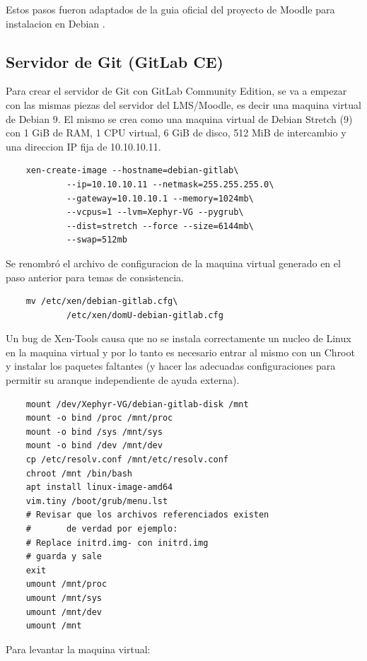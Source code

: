 Estos pasos fueron adaptados de la guia oficial del proyecto de Moodle para instalacion en Debian \citep{MOODLE-Install-Debian}.


\subsection{Servidor de Git (GitLab CE)}
Para crear el servidor de Git con GitLab Community Edition, se va a empezar con las mismas piezas del servidor del LMS/Moodle, es decir una maquina virtual de Debian 9. El mismo se crea como una maquina virtual de Debian Stretch (9) con 1 GiB de RAM, 1 CPU virtual, 6 GiB de disco, 512 MiB de intercambio y una direccion IP fija de 10.10.10.11.
\begin{lstlisting}
	xen-create-image --hostname=debian-gitlab\
    		--ip=10.10.10.11 --netmask=255.255.255.0\
        	--gateway=10.10.10.1 --memory=1024mb\
        	--vcpus=1 --lvm=Xephyr-VG --pygrub\
        	--dist=stretch --force --size=6144mb\
        	--swap=512mb
\end{lstlisting}

Se renombró el archivo de configuracion de la maquina virtual generado en el paso anterior para temas de consistencia.

\begin{lstlisting}
	mv /etc/xen/debian-gitlab.cfg\
    		/etc/xen/domU-debian-gitlab.cfg
\end{lstlisting}

Un bug de Xen-Tools causa que no se instala correctamente un nucleo de Linux en la maquina virtual y por lo tanto es necesario entrar al mismo con un Chroot y instalar los paquetes faltantes (y hacer las adecuadas configuraciones  para permitir su aranque independiente de ayuda externa).

\begin{lstlisting}
	mount /dev/Xephyr-VG/debian-gitlab-disk /mnt
	mount -o bind /proc /mnt/proc
	mount -o bind /sys /mnt/sys
	mount -o bind /dev /mnt/dev
	cp /etc/resolv.conf /mnt/etc/resolv.conf
	chroot /mnt /bin/bash
	apt install linux-image-amd64
	vim.tiny /boot/grub/menu.lst
	# Revisar que los archivos referenciados existen
	#		de verdad por ejemplo:
	# Replace initrd.img- con initrd.img
    # guarda y sale
	exit
	umount /mnt/proc            
	umount /mnt/sys 
	umount /mnt/dev 
	umount /mnt	
\end{lstlisting}

Para levantar la maquina virtual:

